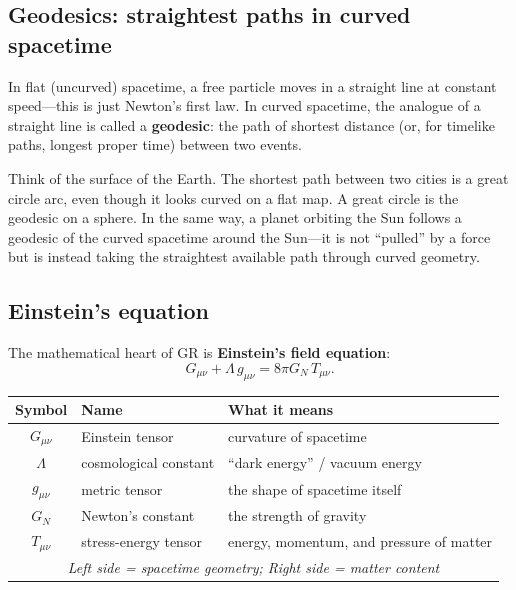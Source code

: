 \documentclass[11pt,a4paper]{article}
\newcommand{\term}[1]{\textbf{#1}}
\newcommand{\GN}{G_{\!N}}
\begin{document}
\subsection{Geodesics: straightest paths in curved spacetime}

In flat (uncurved) spacetime, a free particle moves in a straight line at constant
speed---this is just Newton's first law.
In curved spacetime, the analogue of a straight line is called a \term{geodesic}:
the path of shortest distance (or, for timelike paths, longest proper time) between
two events.

Think of the surface of the Earth.  The shortest path between two cities is a
great circle arc, even though it looks curved on a flat map.  A great circle is the
geodesic on a sphere.  In the same way, a planet orbiting the Sun follows a geodesic
of the curved spacetime around the Sun---it is not ``pulled'' by a force but is
instead taking the straightest available path through curved geometry.

\subsection{Einstein's equation}

The mathematical heart of GR is \term{Einstein's field equation}:
\begin{equation}
  G_{\mu\nu} + \Lambda\, g_{\mu\nu} = 8\pi\GN\, T_{\mu\nu}.
  \label{eq:Einstein}
\end{equation}

\medskip
\begin{center}
\renewcommand{\arraystretch}{1.4}
\begin{tabular}{cll}
\toprule
Symbol & Name & What it means \\
\midrule
$G_{\mu\nu}$ & Einstein tensor & curvature of spacetime \\
$\Lambda$ & cosmological constant & ``dark energy'' / vacuum energy \\
$g_{\mu\nu}$ & metric tensor & the shape of spacetime itself \\
$\GN$ & Newton's constant & the strength of gravity \\
$T_{\mu\nu}$ & stress-energy tensor & energy, momentum, and pressure of matter \\
\midrule
\multicolumn{3}{c}{\textit{Left side = spacetime geometry; \quad Right side = matter content}} \\
\bottomrule
\end{tabular}
\end{center}
\medskip
\end{document}
